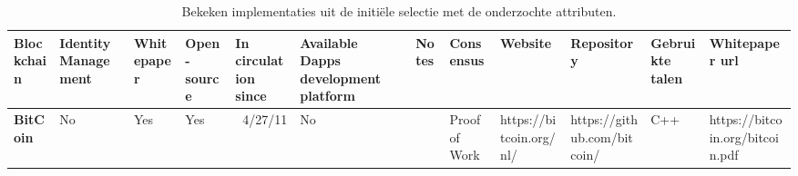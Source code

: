 \begin{table}[ht]
  \centering
  \caption{Bekeken implementaties uit de initiële selectie met de onderzochte attributen.}
  \begin{adjustbox}{width=25cm, height=6cm, angle=270}
    \begin{tabular}{llllrlp{17.915em}rlrrr}
      \toprule
      \textcolor[rgb]{ .188,  .329,  .588}{\textbf{Blockchain}} & \textcolor[rgb]{ .188,  .329,  .588}{\textbf{ Identity Management}} & \textcolor[rgb]{ .188,  .329,  .588}{\textbf{Whitepaper}} & \textcolor[rgb]{ .188,  .329,  .588}{\textbf{Open-source}} & \multicolumn{1}{l}{\textcolor[rgb]{ .188,  .329,  .588}{\textbf{In circulation since}}} & \textcolor[rgb]{ .188,  .329,  .588}{\textbf{Available Dapps development platform}} & \textcolor[rgb]{ .188,  .329,  .588}{\textbf{Notes}} & \multicolumn{1}{l}{\textcolor[rgb]{ .188,  .329,  .588}{\textbf{Consensus}}} & \textcolor[rgb]{ .188,  .329,  .588}{\textbf{Website}} & \multicolumn{1}{l}{\textcolor[rgb]{ .188,  .329,  .588}{\textbf{Repository}}} & \multicolumn{1}{l}{\textcolor[rgb]{ .188,  .329,  .588}{\textbf{Gebruikte talen}}} & \multicolumn{1}{l}{\textcolor[rgb]{ .188,  .329,  .588}{\textbf{Whitepaper url}}} \\
      \midrule
      \rowcolor[rgb]{ .267,  .447,  .769} \textcolor[rgb]{ 1,  1,  1}{\textbf{BitCoin}} & \cellcolor[rgb]{ 1,  .78,  .808}\textcolor[rgb]{ .612,  0,  .024}{No} & \cellcolor[rgb]{ .776,  .937,  .808}\textcolor[rgb]{ 0,  .38,  0}{Yes} & \cellcolor[rgb]{ .776,  .937,  .808}\textcolor[rgb]{ 0,  .38,  0}{Yes} & \cellcolor[rgb]{ .851,  .882,  .949}\textcolor[rgb]{ .188,  .329,  .588}{4/27/11} & \cellcolor[rgb]{ 1,  .78,  .808}\textcolor[rgb]{ .612,  0,  .024}{No} & \multicolumn{1}{r}{\cellcolor[rgb]{ .851,  .882,  .949}\textcolor[rgb]{ .188,  .329,  .588}{}} & \multicolumn{1}{l}{\cellcolor[rgb]{ .851,  .882,  .949}\textcolor[rgb]{ .188,  .329,  .588}{Proof of Work}} & \cellcolor[rgb]{ .851,  .882,  .949}\textcolor[rgb]{ .188,  .329,  .588}{https://bitcoin.org/nl/} & \multicolumn{1}{l}{\cellcolor[rgb]{ .851,  .882,  .949}\textcolor[rgb]{ .188,  .329,  .588}{https://github.com/bitcoin/}} & \multicolumn{1}{l}{\cellcolor[rgb]{ .851,  .882,  .949}\textcolor[rgb]{ .188,  .329,  .588}{C++}} & \multicolumn{1}{l}{\cellcolor[rgb]{ .851,  .882,  .949}\textcolor[rgb]{ .188,  .329,  .588}{https://bitcoin.org/bitcoin.pdf}} \\

\end{tabular}
\end{adjustbox}
\end{table}
